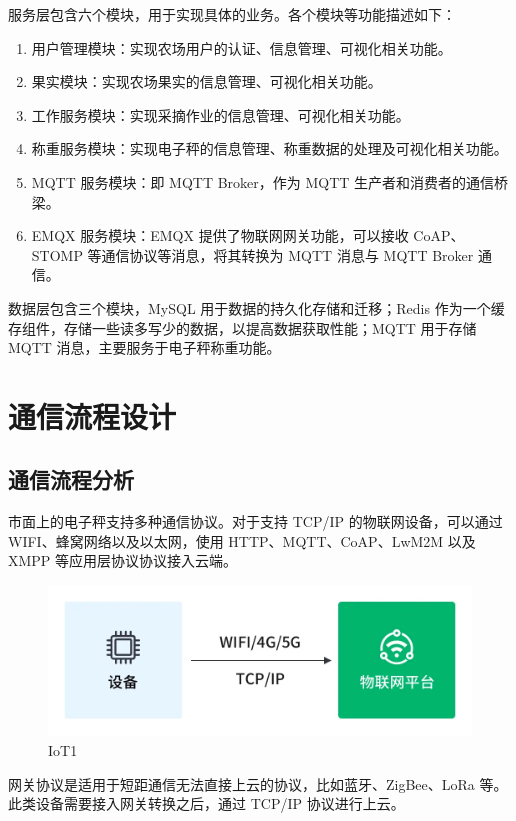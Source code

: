服务层包含六个模块，用于实现具体的业务。各个模块等功能描述如下：

\begin{enumerate}
    \item 用户管理模块：实现农场用户的认证、信息管理、可视化相关功能。
    \item 果实模块：实现农场果实的信息管理、可视化相关功能。
    \item 工作服务模块：实现采摘作业的信息管理、可视化相关功能。
    \item 称重服务模块：实现电子秤的信息管理、称重数据的处理及可视化相关功能。
    \item MQTT 服务模块：即 MQTT Broker，作为 MQTT 生产者和消费者的通信桥梁。
    \item EMQX 服务模块：EMQX 提供了物联网网关功能，可以接收 CoAP、STOMP 等通信协议等消息，将其转换为 MQTT 消息与 MQTT Broker 通信。
\end{enumerate}

数据层包含三个模块，MySQL 用于数据的持久化存储和迁移；Redis 作为一个缓存组件，存储一些读多写少的数据，以提高数据获取性能；MQTT 用于存储 MQTT 消息，主要服务于电子秤称重功能。

\section{通信流程设计}

\subsection{通信流程分析}

市面上的电子秤支持多种通信协议。对于支持 TCP/IP 的物联网设备，可以通过 WIFI、蜂窝网络以及以太网，使用 HTTP、MQTT、CoAP、LwM2M 以及 XMPP 等应用层协议协议接入云端。

\begin{figure}[H]
    \centering
    \includegraphics[width=0.8\linewidth]{../design/IoT1.png}
    \caption{IoT1}
    \label{fig:IoT1}
\end{figure}

网关协议是适用于短距通信无法直接上云的协议，比如蓝牙、ZigBee、LoRa 等。此类设备需要接入网关转换之后，通过 TCP/IP 协议进行上云。

